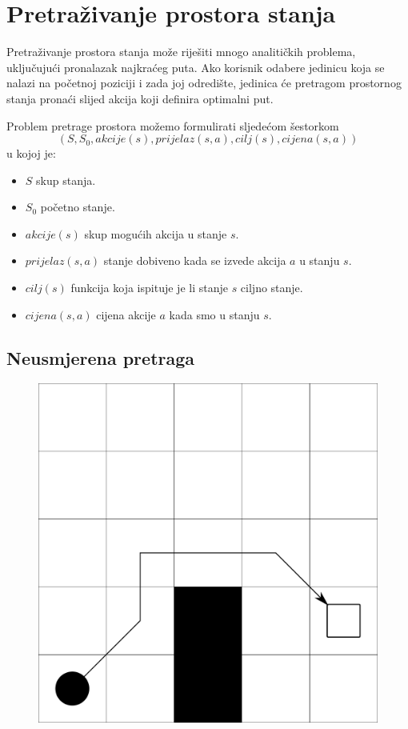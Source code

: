 \documentclass[times, utf8, zavrsni, numeric]{fer}
\begin{document}
\section{Pretraživanje prostora stanja}\label{sec:stateSearch}

\par Pretraživanje prostora stanja može riješiti mnogo analitičkih problema, uključujući pronalazak najkraćeg puta.
Ako korisnik odabere jedinicu koja se nalazi na početnoj poziciji i zada joj odredište, jedinica će pretragom prostornog stanja pronaći slijed akcija koji definira optimalni put.

\par Problem pretrage prostora možemo formulirati sljedećom šestorkom
\[(S, S_0, akcije(s), prijelaz(s, a), cilj(s), cijena(s, a))\]
u kojoj je:
\begin{itemize}
    \item \(S\) skup stanja.
    \item \(S_0\) početno stanje.
    \item \(akcije(s)\) skup mogućih akcija u stanje \(s\).
    \item \(prijelaz(s, a)\) stanje dobiveno kada se izvede akcija \(a\) u stanju \(s\).
    \item \(cilj(s)\) funkcija koja ispituje je li stanje \(s\) ciljno stanje.
    \item \(cijena(s, a)\) cijena akcije \(a\) kada smo u stanju \(s\). 
\end{itemize}

\subsection{Neusmjerena pretraga}

\begin{figure}[h] 
	\centering
	\includegraphics[width=0.3\linewidth]{images/basicGrid.pdf}
	\caption{}
	\label{fig:basicGrid}
\end{figure} 
\end{document}
